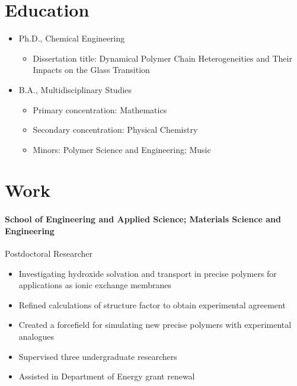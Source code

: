 \documentclass{my_cv}
\begin{document}

\section{Education}
\begin{itemize}
    \item Ph.D., Chemical Engineering
    \begin{itemize}
        \item Dissertation title: Dynamical Polymer Chain Hetero\-ge\-ne\-i\-ties and Their Impacts on the Glass Transition
    \end{itemize}
\end{itemize}
\begin{itemize}
    \item B.A., Multidisciplinary Studies
    \begin{itemize}
        \item Primary concentration: Mathematics
        \item Secondary concentration: Physical Chemistry
    \item Minors: Polymer Science and Engineering; Music
    \end{itemize}
\end{itemize}

\section{Work}
\paragraph{School of Engineering and Applied Science; Materials Science and Engineering\\}
Post\-doctoral Researcher
\begin{itemize}
    \item Investigating hydroxide solvation and transport in precise polymers for applications as ionic exchange membranes
    \item Refined calculations of structure factor to obtain experimental agreement
    \item Created a force\-field for simulating new precise polymers with experimental analogues
    \item Supervised three undergraduate researchers
    \item Assisted in Department of Energy grant renewal
\end{itemize}
\end{document}

